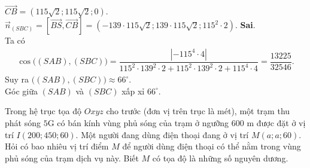 \begin{ex}
{\begin{itemchoice}
			$\vec{CB}=\left(115\sqrt{2};115\sqrt{2};0\right)$.\\
			$\vec{n}_{(SBC)}=\left[\vec{BS},\vec{CB}\right]=\left(-139\cdot 115\sqrt{2};139\cdot 115\sqrt{2};115^2\cdot 2\right)$.
			\itemch \textbf{Sai}.\\
			Ta có
			\begin{align*}
				\cos\big((SAB),(SBC)\big)=\dfrac{\left|-115^4\cdot 4\right|}{115^2\cdot 139^2\cdot 2+115^2\cdot 139^2\cdot 2+115^4\cdot 4}=\dfrac{13225}{32546}.
			\end{align*}
			Suy ra $\big((SAB),(SBC)\big)\approx 66^\circ$.\\
			Góc giữa $(SAB)$ và $(SBC)$ xấp xỉ $66^\circ$.
		\end{itemchoice}
	}
\end{ex}

\begin{ex}%
	Trong hệ trục tọa độ $Oxyz$ cho trước (đơn vị trên trục là mét), một trạm thu phát sóng $5$G có bán kính vùng phủ sóng của trạm ở ngưỡng $600$ m được đặt ở vị trí $I(200 ; 450;60)$. Một người đang dùng điện thoại đang ở vị trí $M(a;a; 60)$. Hỏi có bao nhiêu vị trí điểm $M$ để người dùng điện thoại có thể nằm trong vùng phủ sóng của trạm dịch vụ này. Biết $M$ có tọa độ là những số nguyên dương.
\end{ex}


